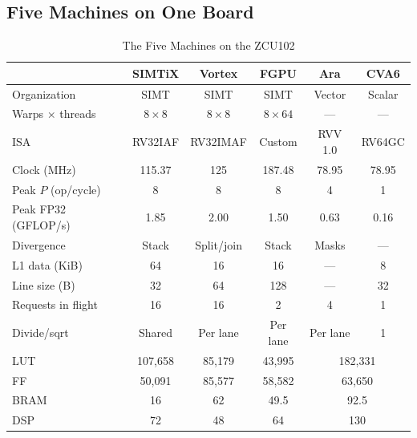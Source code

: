 \documentclass[journal]{IEEEtran}
\begin{document}
\subsection{Five Machines on One Board}\label{sec:machines}
\begin{table}[t]
\caption{The Five Machines on the ZCU102}
\label{tab:machines}
\centering\footnotesize
\setlength{\tabcolsep}{2.2pt}
\begin{tabular}{@{}lccccc@{}}
\toprule
 & SIMTiX & Vortex & FGPU & Ara & CVA6\\
\midrule
Organization             & SIMT & SIMT & SIMT & Vector & Scalar\\
Warps $\times$ threads   & $8\times8$ & $8\times8$ & $8\times64$ & --- & ---\\
ISA                      & RV32IAF & RV32IMAF & Custom & RVV 1.0 & RV64GC\\
Clock (MHz)              & 115.37 & 125 & 187.48 & 78.95 & 78.95\\
Peak $P$ (op/cycle)      & 8 & 8 & 8 & 4 & 1\\
Peak FP32 (GFLOP/s)      & 1.85 & 2.00 & 1.50 & 0.63 & 0.16\\
Divergence               & Stack & Split/join & Stack & Masks & ---\\
L1 data (KiB)            & 64 & 16 & 16 & --- & 8\\
Line size (B)            & 32 & 64 & 128 & --- & 32\\
Requests in flight       & 16 & 16 & 2 & 4 & 1\\
Divide/sqrt              & Shared & Per lane & Per lane & Per lane & 1\\
\midrule
LUT                      & 107,658 & 85,179 & 43,995 & \multicolumn{2}{c}{182,331}\\
FF                       & 50,091 & 85,577 & 58,582 & \multicolumn{2}{c}{63,650}\\
BRAM                     & 16 & 62 & 49.5 & \multicolumn{2}{c}{92.5}\\
DSP                      & 72 & 48 & 64 & \multicolumn{2}{c}{130}\\
\bottomrule
\end{tabular}
\end{table}
\end{document}
